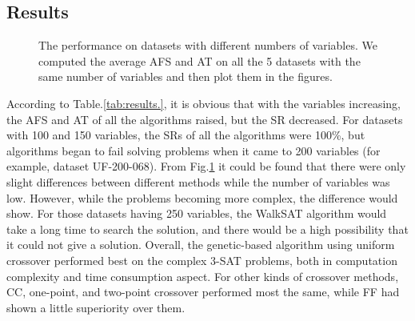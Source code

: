 \subsection{Results}
\begin{figure}[htbp]
	\centering
	\caption{The performance on datasets with different numbers of variables. We computed the average AFS and AT on all the 5 datasets with the same number of variables and then plot them in the figures.}
	\label{fig:performance}
\end{figure}

According to Table.\ref{tab:results.}, it is obvious that with the variables increasing, the AFS and AT of all the algorithms raised, but the SR decreased. For datasets with 100 and 150 variables, the SRs of all the algorithms were 100\%, but algorithms began to fail solving problems when it came to 200 variables (for example, dataset UF-200-068). From Fig.\ref{fig:performance} it could be found that there were only slight differences between different methods while the number of variables was low. However, while the problems becoming more complex, the difference would show. For those datasets having 250 variables, the WalkSAT algorithm would take a long time to search the solution, and there would be a high possibility that it could not give a solution. Overall, the genetic-based algorithm using uniform crossover performed best on the complex 3-SAT problems, both in computation complexity and time consumption aspect. For other kinds of crossover methods, CC, one-point, and two-point crossover performed most the same, while FF had shown a little superiority over them.


